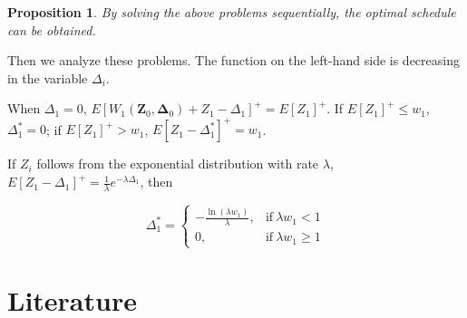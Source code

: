 \documentclass{article}
\newcommand{\Z}{\mathbf{Z}}
\newcommand{\D}{\bm{\Delta}}
\newtheorem{proposition}{\hspace{2em}Proposition}
\begin{document}
\begin{proposition}
    By solving the above problems sequentially, the optimal schedule can be obtained.
\end{proposition}

Then we analyze these problems. The function on the left-hand side is decreasing in the variable $\Delta_{i}$.

When $\Delta_{1} = 0$, $E\left[W_{1}(\Z_{0}, \D_{0}) + Z_{1}- \Delta_{1} \right]^{+} = E\left[Z_{1}\right]^{+}$. If $E\left[Z_{1}\right]^{+} \leq w_{1}$, $\Delta_{1}^{*} = 0$; if $E\left[Z_{1}\right]^{+} > w_{1}$, $E\left[Z_{1}- \Delta_{1}^{*} \right]^{+} = w_1$.

If $Z_{i}$ follows from the exponential distribution with rate $\lambda$, $E\left[Z_{1}- \Delta_{1} \right]^{+} = \frac{1}{\lambda} e^{-\lambda \Delta_{1}}$, then

\begin{equation*}
	\Delta_{1}^{*} = \begin{cases}
	-\frac{\ln (\lambda w_{1})}{\lambda}, & \text{if}~ \lambda w_{1} < 1 \\
	0, & \text{if}~ \lambda w_{1} \geq 1	
	\end{cases}
\end{equation*}






\newpage

\section{Literature}
\end{document}
